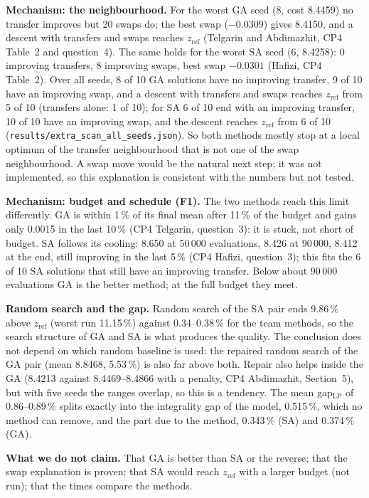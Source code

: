 \documentclass[11pt,a4paper]{article}
\newcommand{\zref}{z_{\mathrm{ref}}}
\begin{document}
\textbf{Mechanism: the neighbourhood.} For the worst GA seed (8, cost 8.4459) no transfer improves but 20 swaps do; the best swap ($-0.0309$) gives 8.4150, and a descent with transfers and swaps reaches $\zref$ (Telgarin and Abdimazhit, CP4 Table~2 and question~4). The same holds for the worst SA seed (6, 8.4258): 0 improving transfers, 8 improving swaps, best swap $-0.0301$ (Hafizi, CP4 Table~2). Over all seeds, 8 of 10 GA solutions have no improving transfer, 9 of 10 have an improving swap, and a descent with transfers and swaps reaches $\zref$ from 5 of 10 (transfers alone: 1 of 10); for SA 6 of 10 end with an improving transfer, 10 of 10 have an improving swap, and the descent reaches $\zref$ from 6 of 10 (\texttt{results/extra\_scan\_all\_seeds.json}). So both methods mostly stop at a local optimum of the transfer neighbourhood that is not one of the swap neighbourhood. A swap move would be the natural next step; it was not implemented, so this explanation is consistent with the numbers but not tested.

\textbf{Mechanism: budget and schedule (F1).} The two methods reach this limit differently. GA is within 1\,\% of its final mean after 11\,\% of the budget and gains only 0.0015 in the last 10\,\% (CP4 Telgarin, question~3): it is stuck, not short of budget. SA follows its cooling: 8.650 at 50\,000 evaluations, 8.426 at 90\,000, 8.412 at the end, still improving in the last 5\,\% (CP4 Hafizi, question~3); this fits the 6 of 10 SA solutions that still have an improving transfer. Below about 90\,000 evaluations GA is the better method; at the full budget they meet.

\textbf{Random search and the gap.} Random search of the SA pair ends 9.86\,\% above $\zref$ (worst run 11.15\,\%) against 0.34--0.38\,\% for the team methods, so the search structure of GA and SA is what produces the quality. The conclusion does not depend on which random baseline is used: the repaired random search of the GA pair (mean 8.8468, 5.53\,\%) is also far above both. Repair also helps inside the GA (8.4213 against 8.4469--8.4866 with a penalty, CP4 Abdimazhit, Section~5), but with five seeds the ranges overlap, so this is a tendency. The mean gap$_{\mathrm{LP}}$ of 0.86--0.89\,\% splits exactly into the integrality gap of the model, 0.515\,\%, which no method can remove, and the part due to the method, 0.343\,\% (SA) and 0.374\,\% (GA).

\textbf{What we do not claim.} That GA is better than SA or the reverse; that the swap explanation is proven; that SA would reach $\zref$ with a larger budget (not run); that the times compare the methods.
\end{document}
